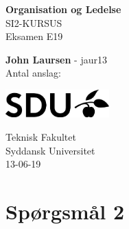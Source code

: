 \documentclass{article}
\begin{document}
\begin{titlepage}
    \begin{center}
        \vspace*{1cm}
        
        {\huge \textbf{Organisation og Ledelse}}
        \\SI2-KURSUS
        \\\vspace{0.5cm}
        Eksamen E19
        
        \vspace{1.5cm}
        
        \textbf{John Laursen} - jaur13 \\
        \vspace{2cm}
        Antal anslag:
        \vspace{12cm}
        
        \hspace*{1.9cm}
        \includegraphics[width=0.3\textwidth]{assets/SDU_BLACK_RGB.png}
        
        Teknisk Fakultet \\
        Syddansk Universitet\\
        13-06-19
    \end{center}
\end{titlepage}
\tableofcontents
\newpage
%
\clearpage
\section{Spørgsmål 2}

\newpage
\printbibliography[title = {Kilder}]
\end{document}
